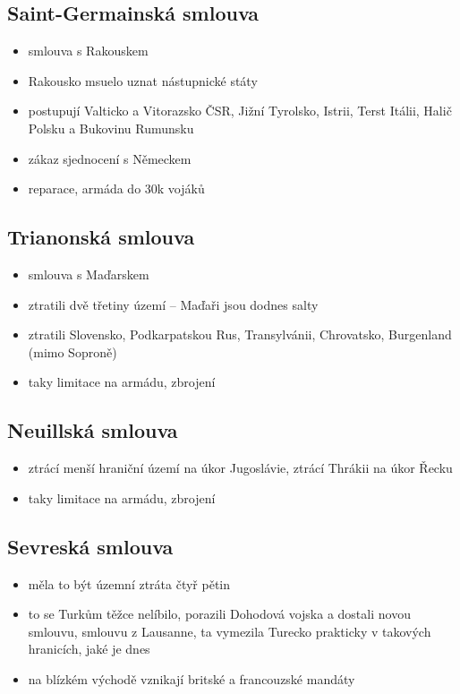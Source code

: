 \documentclass{article}
\begin{document}
\subsection{Saint-Germainská smlouva }
\begin{itemize}
  \item smlouva s Rakouskem
  \item Rakousko msuelo uznat nástupnické státy
  \item postupují Valticko a Vitorazsko ČSR, Jižní Tyrolsko, Istrii, Terst Itálii, Halič Polsku a Bukovinu Rumunsku
  \item zákaz sjednocení s Německem
  \item reparace, armáda do 30k vojáků
\end{itemize}

\subsection{Trianonská smlouva}
\begin{itemize}
  \item smlouva s Maďarskem
  \item ztratili dvě třetiny území -- Maďaři jsou dodnes salty
  \item ztratili Slovensko, Podkarpatskou Rus, Transylvánii, Chrovatsko, Burgenland (mimo Soproně)
  \item taky limitace na armádu, zbrojení
\end{itemize}

\subsection{Neuillská smlouva}
\begin{itemize}
  \item ztrácí menší hraniční území na úkor Jugoslávie, ztrácí Thrákii na úkor Řecku
  \item taky limitace na armádu, zbrojení
\end{itemize}

\subsection{Sevreská smlouva}
\begin{itemize}
  \item měla to být územní ztráta čtyř pětin
  \item to se Turkům těžce nelíbilo, porazili Dohodová vojska a dostali novou smlouvu, smlouvu z Lausanne, ta vymezila Turecko prakticky v takových hranicích, jaké je dnes
  \item na blízkém východě vznikají britské a francouzské mandáty
\end{itemize}
\end{document}
